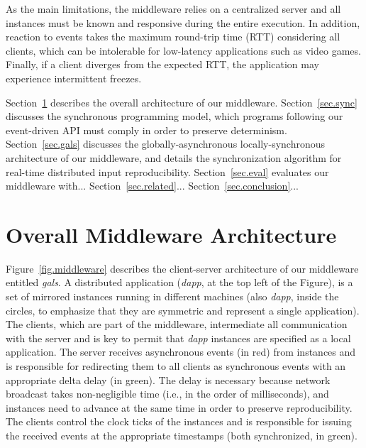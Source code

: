 \documentclass[sigplan,screen]{acmart}
\begin{document}
As the main limitations, the middleware relies on a centralized server and all
instances must be known and responsive during the entire execution.
In addition, reaction to events takes the maximum round-trip time (RTT)
considering all clients, which can be intolerable for low-latency applications
such as video games.
Finally, if a client diverges from the expected RTT, the application may
experience intermittent freezes.

Section~\ref{sec.arch} describes the overall architecture of our middleware.
Section~\ref{sec.sync} discusses the synchronous programming model, which
programs following our event-driven API must comply in order to preserve
determinism.
Section~\ref{sec.gals} discusses the globally-asynchronous locally-synchronous
architecture of our middleware, and details the synchronization algorithm for
real-time distributed input reproducibility.
Section~\ref{sec.eval} evaluates our middleware with...
Section~\ref{sec.related}...
Section~\ref{sec.conclusion}...

\section{Overall Middleware Architecture}
\label{sec.arch}

Figure~\ref{fig.middleware} describes the client-server architecture of our
middleware entitled \emph{gals}.
A distributed application (\emph{dapp}, at the top left of the Figure), is a
set of mirrored instances running in different machines (also \emph{dapp},
inside the circles, to emphasize that they are symmetric and represent a single
application).
The clients, which are part of the middleware, intermediate all communication
with the server and is key to permit that \emph{dapp} instances are specified
as a local application.
The server receives asynchronous events (in red) from instances and is
responsible for redirecting them to all clients as synchronous events with an
appropriate delta delay (in green).
The delay is necessary because network broadcast takes non-negligible time
(i.e., in the order of milliseconds), and instances need to advance at the same
time in order to preserve reproducibility.
The clients control the clock ticks of the instances and is responsible for
issuing the received events at the appropriate timestamps (both synchronized,
in green).
\end{document}
